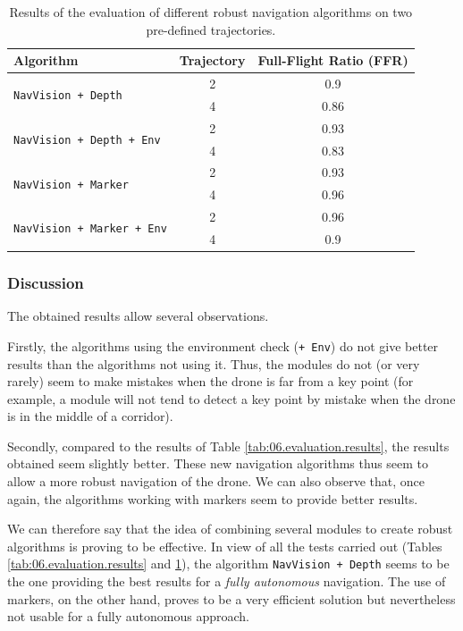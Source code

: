 \begin{table}[H]
    \centering
    \begin{tabular}{|l|c|c|}
        \hline
        \textbf{Algorithm} & \textbf{Trajectory} & \textbf{Full-Flight Ratio} (FFR) \\ \hline
        \hline
        \multirow{2}{*}{\texttt{NavVision + Depth}} & 2 & \num{0.9} \\ \cline{2-3}
        & 4 & \num{0.86} \\ \hline
        \multirow{2}{*}{\texttt{NavVision + Depth + Env}} & 2 & \num{0.93} \\ \cline{2-3}
        & 4 & \num{0.83} \\ \hline
        \multirow{2}{*}{\texttt{NavVision + Marker}} & 2 & \num{0.93} \\ \cline{2-3}
        & 4 & \num{0.96} \\ \hline
        \multirow{2}{*}{\texttt{NavVision + Marker + Env}} & 2 & \num{0.96} \\ \cline{2-3}
        & 4 & \num{0.9} \\ \hline
    \end{tabular}
    \caption{Results of the evaluation of different robust navigation algorithms on two pre-defined trajectories.}
    \label{tab:06.evaluation.robust.results}
\end{table}

\subsubsection{Discussion}

The obtained results allow several observations.

Firstly, the algorithms using the environment check (\texttt{+ Env}) do not give better results than the algorithms not using it. Thus, the modules do not (or very rarely) seem to make mistakes when the drone is far from a key point (for example, a module will not tend to detect a key point by mistake when the drone is in the middle of a corridor).

Secondly, compared to the results of Table \ref{tab:06.evaluation.results}, the results obtained seem slightly better. These new navigation algorithms thus seem to allow a more robust navigation of the drone. We can also observe that, once again, the algorithms working with markers seem to provide better results.

We can therefore say that the idea of combining several modules to create robust algorithms is proving to be effective. In view of all the tests carried out (Tables \ref{tab:06.evaluation.results} and \ref{tab:06.evaluation.robust.results}), the algorithm \texttt{NavVision + Depth} seems to be the one providing the best results for a \emph{fully autonomous} navigation. The use of markers, on the other hand, proves to be a very efficient solution but nevertheless not usable for a fully autonomous approach.

